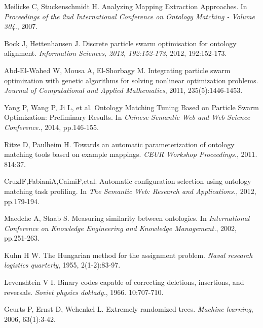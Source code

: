 \documentclass[twoside]{article}
\begin{document}
\begin{thebibliography}{99}
Meilicke C, Stuckenschmidt H. Analyzing Mapping Extraction Approaches. In {\it Proceedings of the 2nd International Conference on Ontology Matching - Volume 304.}, 2007.

Bock J, Hettenhausen J. Discrete particle swarm optimisation for ontology alignment. {\it Information Sciences, 2012, 192:152-173}, 2012, 192:152-173.

Abd-El-Wahed W, Mousa A, El-Shorbagy M. Integrating particle swarm optimization with genetic algorithms for solving nonlinear optimization problems. {\it Journal of Computational and Applied Mathematics}, 2011, 235(5):1446-1453.

Yang P, Wang P, Ji L, et al. Ontology Matching Tuning Based on Particle Swarm Optimization: Preliminary Results. In {\it Chinese Semantic Web and Web Science Conference.}, 2014, pp.146-155.

Ritze D, Paulheim H. Towards an automatic parameterization of ontology matching tools based on example mappings. {\it CEUR Workshop Proceedings.}, 2011. 814:37.

CruzIF,FabianiA,CaimiF,etal. Automatic configuration selection using ontology matching task profiling. In {\it The Semantic Web: Research and Applications.}, 2012, pp.179-194.

Maedche A, Staab S. Measuring similarity between ontologies. In {\it International Conference on Knowledge Engineering and Knowledge Management.}, 2002, pp.251-263.

Kuhn H W. The Hungarian method for the assignment problem. {\it Naval research logistics quarterly}, 1955, 2(1-2):83-97.

Levenshtein V I. Binary codes capable of correcting deletions, insertions, and reversals. {\it Soviet physics doklady.}, 1966. 10:707-710.

Geurts P, Ernst D, Wehenkel L. Extremely randomized trees. {\it Machine learning},  2006, 63(1):3-42.


\end{thebibliography}

\label{last-page}
\label{last-page}
\end{document}
